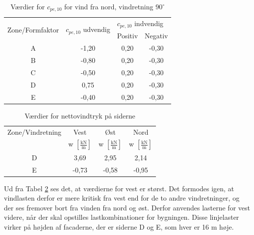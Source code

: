 \begin{table}[htb]
	\begin{center}
		\begin{tabular}{ c c c c } 
			\hline
			\multirow{2}{*}{Zone/Formfaktor} & \multirow{2}{*}{$c_{pe,10}$ udvendig} & \multicolumn{2}{l}{$c_{pe,10}$ indvendig} \\ 
			& & Positiv & Negativ   		\\ \hline
			A & -1,20 & 0,20 & -0,30 \\	
			B & -0,80 & 0,20 & -0,30 \\	
			C & -0,50 & 0,20 & -0,30 \\	 
			D & 0,75 & 0,20 & -0,30 \\	
			E & -0,40 & 0,20 & -0,30 \\	
		\end{tabular}
		\caption{Værdier for $c_{pe,10}$ for vind fra nord, vindretning $90^{\circ}$}
		\label{tab:gg}
	\end{center}
\end{table}

\begin{table}[htb]
	\begin{center}
		\begin{tabular}{c c c c}
			\hline
			Zone/Vindretning & Vest & Øst & Nord \\ 
			& w $[\frac{\text{kN}}{\text{m}}]$ & w $[\frac{\text{kN}}{\text{m}}]$ & w $[\frac{\text{kN}}{\text{m}}]$ \\ \hline
			D & 3,69 & 2,95 & 2,14 \\ 
			E & -0,73 & -0,58 & -0,95 \\ 
		\end{tabular}
		\caption{Værdier for nettovindtryk på siderne}
		\label{tab:hh}
	\end{center}
\end{table}

Ud fra Tabel \ref{tab:hh} ses det, at værdierne for vest er størst. Det formodes igen, at vindlasten derfor er mere kritisk fra vest end for de to andre vindretninger, og der ses fremover bort fra vinden fra nord og øst. Derfor anvendes lasterne for vest videre, når der skal opstilles lastkombinationer for bygningen.
\newline \indent{     }  Disse linjelaster virker på højden af facaderne, der er siderne D og E, som hver er 16 m høje.



